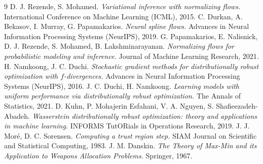 \documentclass[11pt]{article}
\begin{document}
\begin{thebibliography}{9}
 D. J. Rezende, S. Mohamed. \emph{Variational inference with normalizing flows.} International Conference on Machine Learning (ICML), 2015.
 C. Durkan, A. Bekasov, I. Murray, G. Papamakarios. \emph{Neural spline flows.} Advances in Neural Information Processing Systems (NeurIPS), 2019.
 G. Papamakarios, E. Nalisnick, D. J. Rezende, S. Mohamed, B. Lakshminarayanan. \emph{Normalizing flows for probabilistic modeling and inference.} Journal of Machine Learning Research, 2021.
 H. Namkoong, J. C. Duchi. \emph{Stochastic gradient methods for distributionally robust optimization with $f$-divergences.} Advances in Neural Information Processing Systems (NeurIPS), 2016.
 J. C. Duchi, H. Namkoong. \emph{Learning models with uniform performance via distributionally robust optimization.} The Annals of Statistics, 2021.
 D. Kuhn, P. Mohajerin Esfahani, V. A. Nguyen, S. Shafieezadeh-Abadeh. \emph{Wasserstein distributionally robust optimization: theory and applications in machine learning.} INFORMS TutORials in Operations Research, 2019.
 J. J. Mor\'e, D. C. Sorensen. \emph{Computing a trust region step.} SIAM Journal on Scientific and Statistical Computing, 1983.
 J. M. Danskin. \emph{The Theory of Max-Min and its Application to Weapons Allocation Problems.} Springer, 1967.

\end{thebibliography}
\end{document}
